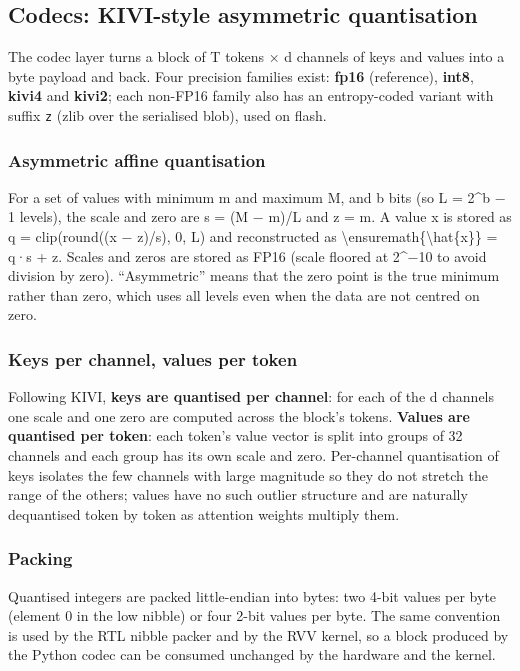\documentclass[12pt,a4paper]{report}
\begin{document}
\subsection{Codecs: KIVI-style asymmetric quantisation}\label{sec:5_4}
The codec layer turns a block of T tokens × d channels of keys and values into a byte payload and back. Four precision families exist: \textbf{fp16} (reference), \textbf{int8}, \textbf{kivi4} and \textbf{kivi2}; each non-FP16 family also has an entropy-coded variant with suffix \texttt{z} (zlib over the serialised blob), used on flash.

\subsubsection{Asymmetric affine quantisation}\label{sec:5_4_1}
For a set of values with minimum m and maximum M, and b bits (so L = 2\textasciicircum{}b − 1 levels), the scale and zero are s = (M − m)/L and z = m. A value x is stored as q = clip(round((x − z)/s), 0, L) and reconstructed as \textbackslash{}ensuremath\{\textbackslash{}hat\{x\}\} = q·s + z. Scales and zeros are stored as FP16 (scale floored at 2\textasciicircum{}−10 to avoid division by zero). “Asymmetric” means that the zero point is the true minimum rather than zero, which uses all levels even when the data are not centred on zero.

\subsubsection{Keys per channel, values per token}\label{sec:5_4_2}
Following KIVI, \textbf{keys are quantised per channel}: for each of the d channels one scale and one zero are computed across the block's tokens. \textbf{Values are quantised per token}: each token's value vector is split into groups of 32 channels and each group has its own scale and zero. Per-channel quantisation of keys isolates the few channels with large magnitude so they do not stretch the range of the others; values have no such outlier structure and are naturally dequantised token by token as attention weights multiply them.

\subsubsection{Packing}\label{sec:5_4_3}
Quantised integers are packed little-endian into bytes: two 4-bit values per byte (element 0 in the low nibble) or four 2-bit values per byte. The same convention is used by the RTL nibble packer and by the RVV kernel, so a block produced by the Python codec can be consumed unchanged by the hardware and the kernel.
\end{document}
